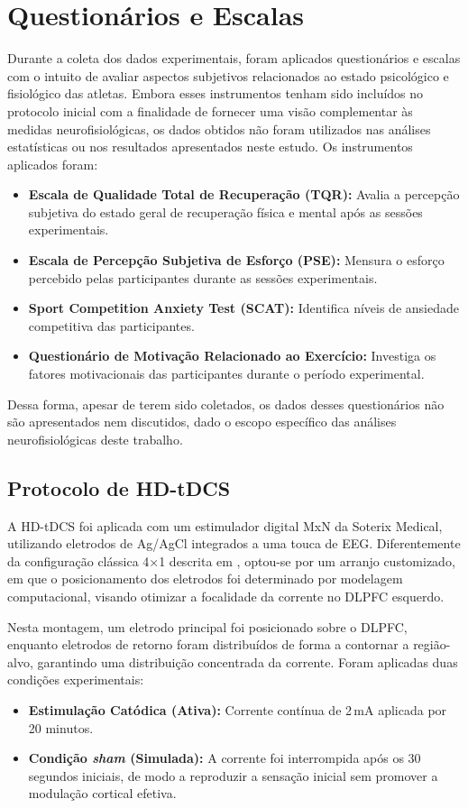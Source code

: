 \section{Questionários e Escalas}
Durante a coleta dos dados experimentais, foram aplicados questionários e escalas com o intuito de avaliar aspectos subjetivos relacionados ao estado psicológico e fisiológico das atletas. Embora esses instrumentos tenham sido incluídos no protocolo inicial com a finalidade de fornecer uma visão complementar às medidas neurofisiológicas, os dados obtidos não foram utilizados nas análises estatísticas ou nos resultados apresentados neste estudo. Os instrumentos aplicados foram:

\begin{itemize}
    \item \textbf{Escala de Qualidade Total de Recuperação (TQR):} Avalia a percepção subjetiva do estado geral de recuperação física e mental após as sessões experimentais.
    \item \textbf{Escala de Percepção Subjetiva de Esforço (PSE):} Mensura o esforço percebido pelas participantes durante as sessões experimentais.
    \item \textbf{Sport Competition Anxiety Test (SCAT):} Identifica níveis de ansiedade competitiva das participantes.
    \item \textbf{Questionário de Motivação Relacionado ao Exercício:} Investiga os fatores motivacionais das participantes durante o período experimental.
\end{itemize}

Dessa forma, apesar de terem sido coletados, os dados desses questionários não são apresentados nem discutidos, dado o escopo específico das análises neurofisiológicas deste trabalho.

\subsection{Protocolo de HD-tDCS}
\label{subsec:hdtdcs_protocol}
A HD-tDCS foi aplicada com um estimulador digital MxN da Soterix Medical, utilizando eletrodos de Ag/AgCl integrados a uma touca de EEG. Diferentemente da configuração clássica 4$\times$1 descrita em , optou-se por um arranjo customizado, em que o posicionamento dos eletrodos foi determinado por modelagem computacional, visando otimizar a focalidade da corrente no DLPFC esquerdo.

Nesta montagem, um eletrodo principal foi posicionado sobre o DLPFC, enquanto eletrodos de retorno foram distribuídos de forma a contornar a região-alvo, garantindo uma distribuição concentrada da corrente. Foram aplicadas duas condições experimentais:
\begin{itemize}
    \item \textbf{Estimulação Catódica (Ativa):} Corrente contínua de 2\,mA aplicada por 20 minutos.
    \item \textbf{Condição \textit{sham} (Simulada):} A corrente foi interrompida após os 30\,segundos iniciais, de modo a reproduzir a sensação inicial sem promover a modulação cortical efetiva.
\end{itemize}

